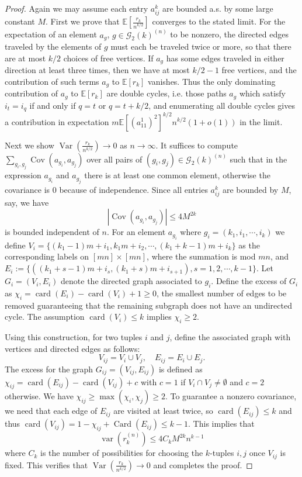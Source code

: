\documentclass[12pt, reqno]{amsart}
\theoremstyle{definition}
\theoremstyle{remark}
\numberwithin{equation}{section}
\begin{document}
\begin{proof} Again we may assume each entry $a_{ij}^k$ are bounded a.s. by some large constant $M$.
    First we prove that $\mathbb{E}[\frac{r_k}{n^{k/2}}]$ converges to the stated limit. For the expectation of an element $a_g$, $g\in\mathcal{G}_2(k)^{(n)}$ to be nonzero, the directed edges traveled by the elements of $g$ must each be traveled twice or more, so that there are at most $k/2$ choices of free vertices. If $a_g$ has some edges traveled in either direction at least three times, then we have at most $k/2-1$ free vertices, and the contribution of such terms $a_g$ to $\mathbb{E}[r_k]$ vanishes. Thus the only dominating contribution of $a_g$ to $\mathbb{E}[r_k]$ are double cycles, i.e. those paths $a_g$ which satisfy $i_t=i_q$ if and only if $q=t$ or $q=t+k/2$, and enumerating all double cycles gives a contribution in expectation $m\mathbb{E}[(a_{11}^1)^2]^{k/2}n^{k/2}(1+o(1))$ in the limit.

    Next we show $\operatorname{Var}(\frac{r_k}{n^{k/2}})\to 0$ as $n\to\infty.$ It suffices to compute $\sum_{g_i,g_j}\operatorname{Cov}(a_{g_i},a_{g_j})$ over all pairs of $(g_i,g_j)\in\mathcal{G}_2(k)^{(n)}$ such that in the expression $a_{g_i}$ and $a_{g_j}$ there is at least one common element, otherwise the covariance is 0 because of independence. Since all entries $a_{ij}^k$ are bounded by $M$, say, we have
    $$
|\operatorname{Cov}(a_{g_i},a_{g_j})|\leq 4M^{2k}
    $$  
    is bounded independent of $n$. For an element $a_{g_i}$ where $g_i=(k_1,i_1,\cdots,i_k)$ we define $V_i=\{(k_1-1)m+i_1,k_1m+i_2,\cdots,(k_1+k-1)m+i_k\}$ as the corresponding labels on $[mn]\times[mn]$, where the summation is mod $mn$, and  $E_i:=\{((k_1+s-1)m+i_s,(k_{1}+s)m+i_{s+1}),s=1,2,\cdots,k-1\}$. Let $G_i=(V_i,E_i)$ denote the directed graph associated to $g_i$. Define the excess of $G_i$ as $\chi_i=\operatorname{card}(E_i)-\operatorname{card}(V_i)+1\geq 0$, the smallest number of edges to be removed guaranteeing that the remaining subgraph does not have an undirected cycle. The assumption $\operatorname{card}(V_i)\leq k$ implies $\chi_i\geq 2$. 
    
Using this construction, for two tuples $i$ and $j$, define the associated graph with vertices and directed edges as follows:
$$
V_{ij}=V_i\cup V_j,\quad E_{ij}=E_i\cup E_j.$$
The excess for the graph $G_{ij}=(V_{ij},E_{ij})$ is defined as $\chi_{ij}=\operatorname{card}(E_{ij})-\operatorname{card}(V_{ij})+c$ with $c=1$ if $V_i\cap V_j\neq\emptyset$ and $c=2$ otherwise. We have $\chi_{ij}\geq\max(\chi_i,\chi_j)\geq 2$. To guarantee a nonzero covariance, we need that each edge of $E_{ij}$ are visited at least twice, so $\operatorname{card}(E_{ij})\leq k$ and thus $\operatorname{card}(V_{ij})=1-\chi_{ij}+\operatorname{Card}(E_{ij})\leq k-1$. This implies that 
$$
\operatorname{var}(r_k^{(n)})\leq 4C_kM^{2k}n^{k-1}
$$ where $C_k$ is the number of possibilities for choosing the $k$-tuples $i,j$ once $V_{ij}$ is fixed. This verifies that $\operatorname{Var}(\frac{r_k}{n^{k/2}})\to 0$ and completes the proof.
\end{proof}
\end{document}
